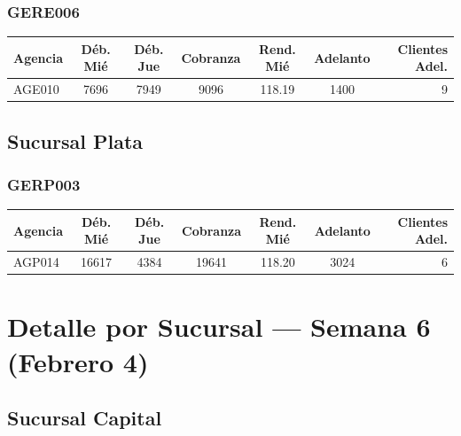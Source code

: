 \documentclass[11pt,a4paper]{article}
\begin{document}
\subsubsection{GERE006}

\begin{center}
\renewcommand{\arraystretch}{1.2}
\footnotesize
\begin{tabular}{lS[table-format=5.0]S[table-format=5.0]S[table-format=5.0]S[table-format=3.2]S[table-format=5.0]r}
\toprule
\textbf{Agencia}
  & {\textbf{D\'eb. Mi\'e}} & {\textbf{D\'eb. Jue}} & {\textbf{Cobranza}}
  & {\textbf{Rend. Mi\'e}} & {\textbf{Adelanto}} & \textbf{Clientes Adel.} \\
\midrule
AGE010 & 7696 & 7949 & 9096 & 118.19 & 1400 & 9 \\
\bottomrule
\end{tabular}
\end{center}

\subsection{Sucursal Plata}

\subsubsection{GERP003}

\begin{center}
\renewcommand{\arraystretch}{1.2}
\footnotesize
\begin{tabular}{lS[table-format=5.0]S[table-format=5.0]S[table-format=5.0]S[table-format=3.2]S[table-format=5.0]r}
\toprule
\textbf{Agencia}
  & {\textbf{D\'eb. Mi\'e}} & {\textbf{D\'eb. Jue}} & {\textbf{Cobranza}}
  & {\textbf{Rend. Mi\'e}} & {\textbf{Adelanto}} & \textbf{Clientes Adel.} \\
\midrule
AGP014 & 16617 & 4384 & 19641 & 118.20 & 3024 & 6 \\
\bottomrule
\end{tabular}
\end{center}

\section{Detalle por Sucursal --- Semana 6 (Febrero 4)}

\subsection{Sucursal Capital}
\end{document}
